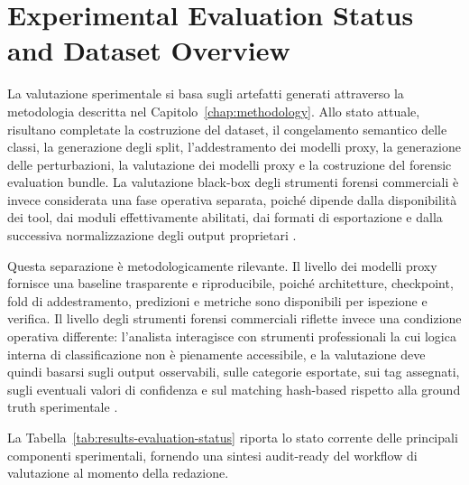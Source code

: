 \section{Experimental Evaluation Status and Dataset Overview}
\label{sec:results-status}

La valutazione sperimentale si basa sugli artefatti generati attraverso la
metodologia descritta nel Capitolo~\ref{chap:methodology}. Allo stato attuale,
risultano completate la costruzione del dataset, il congelamento semantico delle
classi, la generazione degli split, l'addestramento dei modelli proxy, la
generazione delle perturbazioni, la valutazione dei modelli proxy e la
costruzione del forensic evaluation bundle. La valutazione black-box degli
strumenti forensi commerciali è invece considerata una fase operativa separata,
poiché dipende dalla disponibilità dei tool, dai moduli effettivamente abilitati,
dai formati di esportazione e dalla successiva normalizzazione degli output
proprietari \cite{sanna2024preliminary,sanna2025pixelperfect,magnet,xways,cellebrite,oxygen}.

Questa separazione è metodologicamente rilevante. Il livello dei modelli proxy
fornisce una baseline trasparente e riproducibile, poiché architetture,
checkpoint, fold di addestramento, predizioni e metriche sono disponibili per
ispezione e verifica. Il livello degli strumenti forensi commerciali riflette
invece una condizione operativa differente: l'analista interagisce con strumenti
professionali la cui logica interna di classificazione non è pienamente
accessibile, e la valutazione deve quindi basarsi sugli output osservabili, sulle
categorie esportate, sui tag assegnati, sugli eventuali valori di confidenza e
sul matching hash-based rispetto alla ground truth sperimentale
\cite{casey2011digital,nist2006guide,iso27041,iso27042}.

La Tabella~\ref{tab:results-evaluation-status} riporta lo stato corrente delle
principali componenti sperimentali, fornendo una sintesi audit-ready del workflow
di valutazione al momento della redazione.

